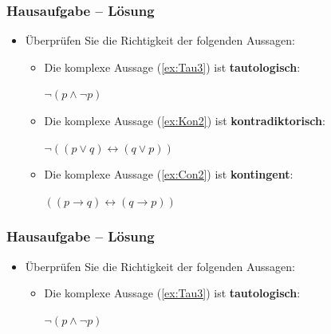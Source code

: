 {
\begin{frame}
\frametitle{Hausaufgabe -- Lösung}

\begin{itemize}
	\item Überprüfen Sie die Richtigkeit der folgenden Aussagen:
	
	\vspace{1em}
	
	\begin{itemize}
		\item Die komplexe Aussage (\ref{ex:Tau3}) ist \textbf{tautologisch}:
		
		\ea\label{ex:Tau3} $\lnot (p \land \lnot p)$
		\z
		
		\item Die komplexe Aussage (\ref{ex:Kon2}) ist \textbf{kontradiktorisch}:
		
		\ea\label{ex:Kon2} $\lnot ((p \lor q) \leftrightarrow (q \lor p))$
		\z
		
		\item Die komplexe Aussage (\ref{ex:Con2}) ist \textbf{kontingent}:
		
		\ea\label{ex:Con2} $((p \rightarrow q) \leftrightarrow (q \rightarrow p))$
		\z
		
	\end{itemize}	
	
\end{itemize}

\end{frame}


\begin{frame}
\frametitle{Hausaufgabe -- Lösung}

\begin{itemize}
	\item Überprüfen Sie die Richtigkeit der folgenden Aussagen:
	
	\vspace{1em}
	
	\begin{itemize}
		\item Die komplexe Aussage (\ref{ex:Tau3}) ist \textbf{tautologisch}:
		
		\begin{exe}
		 $\lnot (p \land \lnot p)$
		\end{exe}
	\end{itemize}	
	
\end{itemize}


\end{frame}}
